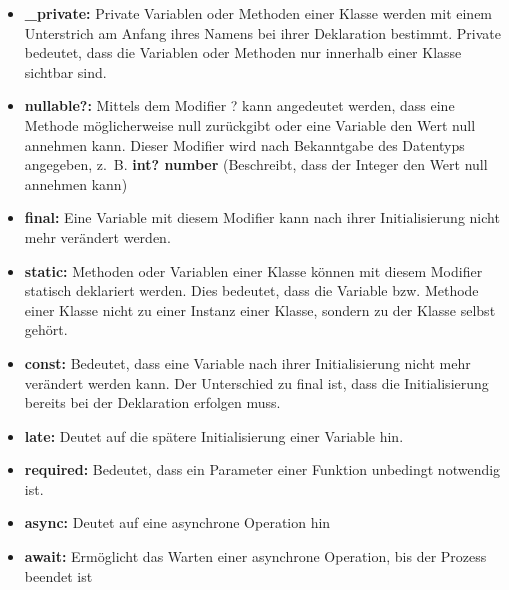 \begin{itemize}
    \item {\textbf{\_private:}} Private Variablen oder Methoden einer Klasse werden mit einem Unterstrich am Anfang ihres Namens bei ihrer Deklaration bestimmt. Private bedeutet, dass die Variablen oder Methoden nur innerhalb einer Klasse sichtbar sind.
    
    \item {\textbf{nullable?:}} Mittels dem Modifier ? kann angedeutet werden, dass eine Methode möglicherweise null zurückgibt oder eine Variable den Wert null annehmen kann. Dieser Modifier wird nach Bekanntgabe des Datentyps angegeben, z. B. {\textbf{int? number}} (Beschreibt, dass der Integer den Wert null annehmen kann)
    
    \item {\textbf{final:}} Eine Variable mit diesem Modifier kann nach ihrer Initialisierung nicht mehr verändert werden.
    
    \item {\textbf{static:}} Methoden oder Variablen einer Klasse können mit diesem Modifier statisch deklariert werden. Dies bedeutet, dass die Variable bzw. Methode einer Klasse nicht zu einer Instanz einer Klasse, sondern zu der Klasse selbst gehört. 
    
    \item {\textbf{const:}} Bedeutet, dass eine Variable nach ihrer Initialisierung nicht mehr verändert werden kann. Der Unterschied zu final ist, dass die Initialisierung bereits bei der Deklaration erfolgen muss.
    
    \item {\textbf{late:}} Deutet auf die spätere Initialisierung einer Variable hin.
    
    \item {\textbf{required:}} Bedeutet, dass ein Parameter einer Funktion  unbedingt notwendig ist.
    
    \item {\textbf{async:}} Deutet auf eine asynchrone Operation hin
    
    \item {\textbf{await:}} Ermöglicht das Warten einer asynchrone Operation, bis der Prozess beendet ist
\end{itemize}





